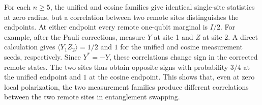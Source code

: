 For each $n\ge5$, the unified and cosine families give identical single-site statistics at zero radius, but a correlation between two remote sites distinguishes the endpoints. At either endpoint every remote one-qubit marginal is $I/2$. For example, after the Pauli corrections, measure $Y$ at site 1 and $Z$ at site 2. A direct calculation gives $\langle Y_1 Z_2\rangle=1/2$ and $1$ for the unified and cosine measurement seeds, respectively. Since $Y^*=-Y$, these correlations change sign in the corrected remote states. The two sites thus obtain opposite signs with probability $3/4$ at the unified endpoint and $1$ at the cosine endpoint. This shows that, even at zero local polarization, the two measurement families produce different correlations between the two remote sites in entanglement swapping.
